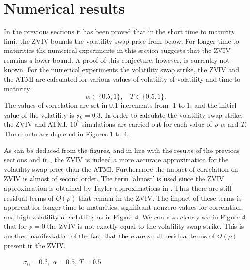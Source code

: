 \documentclass[11pt]{article}
\begin{document}
\section{Numerical results}
In the previous sections it has been proved that in the short time to maturity limit the ZVIV bounds the volatility swap price from below. For longer time to maturities the numerical experiments in this section suggests that the ZVIV remains a lower bound. A proof of this conjecture, however, is currently not known. For the numerical experiments the volatility swap strike, the ZVIV and the ATMI are calculated for various values of volatility of volatility and time to maturity:
$$
\alpha \in \{0.5,1\}, \quad T \in \{0.5,1\}.
$$
The values of correlation are set in 0.1 increments from -1 to 1, and the initial value of the volatility is $\sigma_0 = 0.3$.
In order to calculate the volatility swap strike, the ZVIV and ATMI, $10^7$ simulations are carried out for each value of $\rho, \alpha$ and $T$. The results are depicted in Figures 1 to 4.

As can be deduced from the figures, and in line with the results of the previous sections and in \cite{ARS}, the ZVIV is indeed a more accurate approximation for the volatility swap price than the ATMI. Furthermore the impact of correlation on ZVIV is almost of second order. The term 'almost' is used since the ZVIV approximation is obtained by Taylor approximations in \cite{RA}. Thus there are still residual terms of $O(\rho)$ that remain in the ZVIV. The impact of these terms is apparent for longer time to maturities, significant nonzero values for correlation, and high volatility of volatility as in Figure 4. We can also clearly see in Figure 4 that for $\rho = 0$ the ZVIV is not exactly equal to the volatility swap strike. This is another manifestation of the fact that there are small residual terms of  $O(\rho)$ present in the ZVIV.


\begin{figure}
\centering
{}
\caption{$\sigma_0 = 0.3, \; \alpha = 0.5, \; T = 0.5$}
\end{figure}
\end{document}
